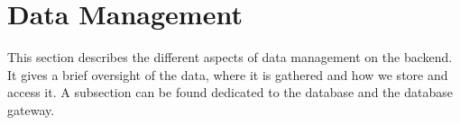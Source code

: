 \section{Data Management}
\label{sec:datamanage}

This section describes the different aspects of data management on the backend. It gives a brief oversight of the data, where it is gathered and how we store and access it. A subsection can be found dedicated to the database and the database gateway.


